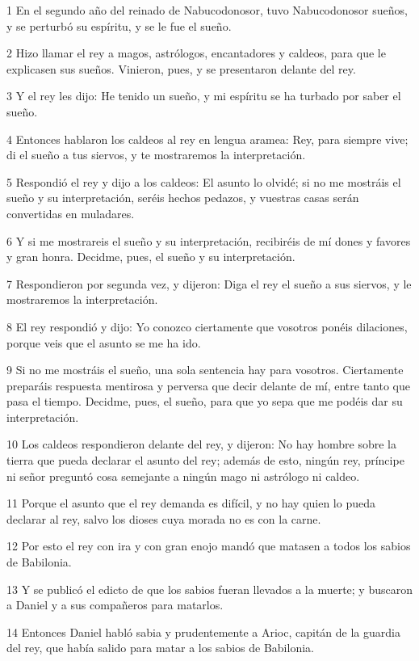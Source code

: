 \par 1 En el segundo año del reinado de Nabucodonosor, tuvo Nabucodonosor sueños, y se perturbó su espíritu, y se le fue el sueño.
\par 2 Hizo llamar el rey a magos, astrólogos, encantadores y caldeos, para que le explicasen sus sueños. Vinieron, pues, y se presentaron delante del rey.
\par 3 Y el rey les dijo: He tenido un sueño, y mi espíritu se ha turbado por saber el sueño.
\par 4 Entonces hablaron los caldeos al rey en lengua aramea: Rey, para siempre vive; di el sueño a tus siervos, y te mostraremos la interpretación.
\par 5 Respondió el rey y dijo a los caldeos: El asunto lo olvidé; si no me mostráis el sueño y su interpretación, seréis hechos pedazos, y vuestras casas serán convertidas en muladares.
\par 6 Y si me mostrareis el sueño y su interpretación, recibiréis de mí dones y favores y gran honra. Decidme, pues, el sueño y su interpretación.
\par 7 Respondieron por segunda vez, y dijeron: Diga el rey el sueño a sus siervos, y le mostraremos la interpretación.
\par 8 El rey respondió y dijo: Yo conozco ciertamente que vosotros ponéis dilaciones, porque veis que el asunto se me ha ido.
\par 9 Si no me mostráis el sueño, una sola sentencia hay para vosotros. Ciertamente preparáis respuesta mentirosa y perversa que decir delante de mí, entre tanto que pasa el tiempo. Decidme, pues, el sueño, para que yo sepa que me podéis dar su interpretación.
\par 10 Los caldeos respondieron delante del rey, y dijeron: No hay hombre sobre la tierra que pueda declarar el asunto del rey; además de esto, ningún rey, príncipe ni señor preguntó cosa semejante a ningún mago ni astrólogo ni caldeo.
\par 11 Porque el asunto que el rey demanda es difícil, y no hay quien lo pueda declarar al rey, salvo los dioses cuya morada no es con la carne.
\par 12 Por esto el rey con ira y con gran enojo mandó que matasen a todos los sabios de Babilonia.
\par 13 Y se publicó el edicto de que los sabios fueran llevados a la muerte; y buscaron a Daniel y a sus compañeros para matarlos.
\par 14 Entonces Daniel habló sabia y prudentemente a Arioc, capitán de la guardia del rey, que había salido para matar a los sabios de Babilonia.
